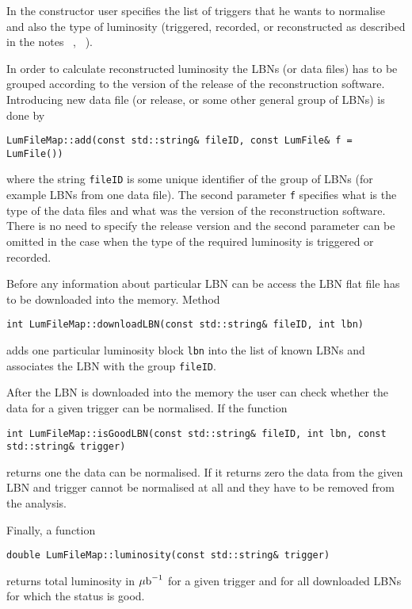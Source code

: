 \documentclass[12pt]{article}
\begin{document}
In the constructor user specifies the list of triggers that he wants
to normalise and also the type of luminosity (triggered, recorded, or
reconstructed as described in the notes ~\cite{3971}, ~\cite{3972}).

In order to calculate reconstructed luminosity the LBNs (or data
files) has to be grouped according to the version of the release of
the reconstruction software. Introducing new data file (or release, or
some other general group of LBNs) is done by

\begin{flushleft}
\hspace*{4mm} {\tt LumFileMap::add(const std::string\& fileID, const
LumFile\& f = LumFile())}
\end{flushleft}

where the string {\tt fileID} is some unique identifier of the group
 of LBNs (for example LBNs from one data file). The second parameter
 {\tt f} specifies what is the type of the data files and what was the
 version of the reconstruction software. There is no need to specify
 the release version and the second parameter can be omitted in the
 case when the type of the required luminosity is triggered or
 recorded.

Before any information about particular LBN can be access the LBN flat file has to be downloaded into the memory. Method
\begin{flushleft}
\hspace*{4mm} {\tt int LumFileMap::downloadLBN(const std::string\& fileID, int lbn)}
\end{flushleft}
adds one particular luminosity block {\tt lbn} into the list of known LBNs and
associates the LBN with the group {\tt fileID}.

After the LBN is downloaded into the memory the user can check whether the data for a given trigger can be normalised. If the function
\begin{flushleft}
\hspace*{4mm} {\tt int LumFileMap::isGoodLBN(const std::string\& fileID, int lbn,
\hspace*{61.82mm}const std::string\& trigger)}
\end{flushleft}
returns one the data can be normalised. If it returns zero the data from the given LBN and trigger cannot be normalised at all and they have to be removed from the analysis.

Finally, a function
\begin{flushleft}
\hspace*{4mm} {\tt double LumFileMap::luminosity(const std::string\& trigger)}
\end{flushleft}
returns total luminosity in $\mu\hbox{b}^{-1}$ for a given trigger and for
all downloaded LBNs for which the status is good.
\end{document}
